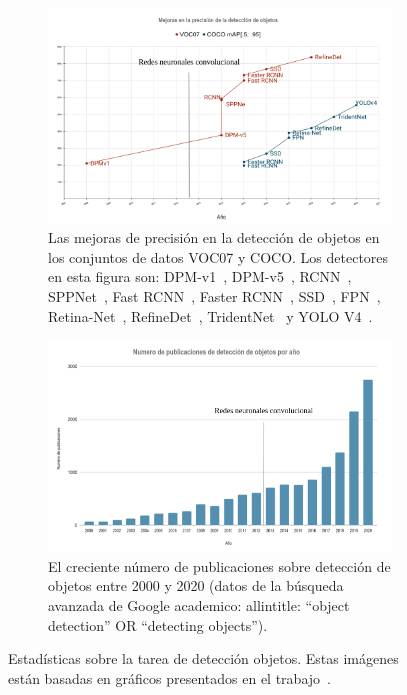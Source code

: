 \begin{figure}[]
	\centering
	\begin{subfigure}{0.75\textwidth}
		\centering
		\includegraphics[width=1\textwidth]{img/evolucion_2.png}
		\caption{Las mejoras de precisión en la detección de objetos en los conjuntos de datos VOC07 y COCO. Los detectores en esta figura son: DPM-v1~\cite{felzenszwalb2008discriminatively}, DPM-v5~\cite{sadeghi201430hz}, RCNN~\cite{girshick2014rich}, SPPNet~\cite{girshick2014rich}, Fast RCNN~\cite{he2015spatial}, Faster RCNN~\cite{ren2015faster}, SSD~\cite{liu2016ssd}, FPN~\cite{lin2017feature}, Retina-Net~\cite{lin2017focal}, RefineDet~\cite{zhang2018single}, TridentNet~\cite{li2019scale} y YOLO V4~\cite{wang2020scaled}.}
	\end{subfigure}
	\centering
	\begin{subfigure}{0.75\textwidth}
		\centering
		\includegraphics[width=1\textwidth]{img/evolucion_1.png}
		\caption{El creciente número de publicaciones sobre detección de objetos entre 2000 y 2020 (datos de la búsqueda avanzada de Google academico: allintitle: ``object detection'' OR ``detecting objects'').}
	\end{subfigure}
	\caption{Estadísticas sobre la tarea de detección objetos. Estas imágenes están basadas en gráficos presentados en el trabajo~\cite{zou2019object}.}
	\label{fig:evolucion}
\end{figure}

